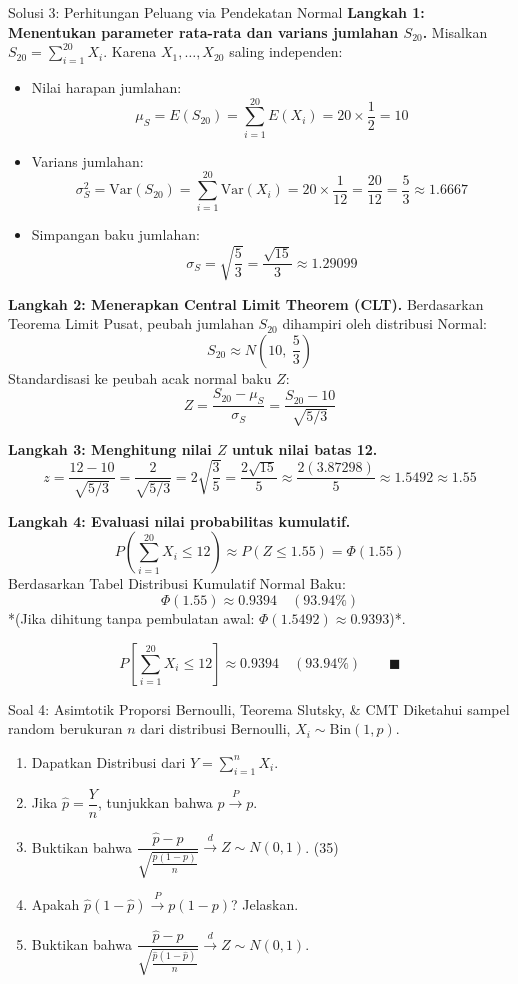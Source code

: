 \documentclass[10pt,twoside]{article}
\begin{document}
\begin{solbox}{Solusi 3: Perhitungan Peluang via Pendekatan Normal}
\textbf{Langkah 1: Menentukan parameter rata-rata dan varians jumlahan $S_{20}$.}
Misalkan $S_{20} = \sum_{i=1}^{20} X_i$. Karena $X_1, \dots, X_{20}$ saling independen:
\begin{itemize}
  \item Nilai harapan jumlahan:
  \[
  \mu_{S} = E(S_{20}) = \sum_{i=1}^{20} E(X_i) = 20 \times \frac{1}{2} = 10
  \]
  \item Varians jumlahan:
  \[
  \sigma_{S}^2 = \mathrm{Var}(S_{20}) = \sum_{i=1}^{20} \mathrm{Var}(X_i) = 20 \times \frac{1}{12} = \frac{20}{12} = \frac{5}{3} \approx 1.6667
  \]
  \item Simpangan baku jumlahan:
  \[
  \sigma_{S} = \sqrt{\frac{5}{3}} = \frac{\sqrt{15}}{3} \approx 1.29099
  \]
\end{itemize}

\textbf{Langkah 2: Menerapkan Central Limit Theorem (CLT).}
Berdasarkan Teorema Limit Pusat, peubah jumlahan $S_{20}$ dihampiri oleh distribusi Normal:
\[
S_{20} \approx N\left(10, \ \frac{5}{3}\right)
\]
Standardisasi ke peubah acak normal baku $Z$:
\[
Z = \frac{S_{20} - \mu_S}{\sigma_S} = \frac{S_{20} - 10}{\sqrt{5/3}}
\]

\textbf{Langkah 3: Menghitung nilai $Z$ untuk nilai batas 12.}
\[
z = \frac{12 - 10}{\sqrt{5/3}} = \frac{2}{\sqrt{5/3}} = 2\sqrt{\frac{3}{5}} = \frac{2\sqrt{15}}{5} \approx \frac{2(3.87298)}{5} \approx 1.5492 \approx 1.55
\]

\textbf{Langkah 4: Evaluasi nilai probabilitas kumulatif.}
\[
P\left(\sum_{i=1}^{20} X_i \le 12\right) \approx P(Z \le 1.55) = \Phi(1.55)
\]
Berdasarkan Tabel Distribusi Kumulatif Normal Baku:
\[
\Phi(1.55) \approx 0.9394 \quad (93.94\%)
\]
*(Jika dihitung tanpa pembulatan awal: $\Phi(1.5492) \approx 0.9393$)*.

\[
\boxed{P\left[\sum_{i=1}^{20} X_i \le 12\right] \approx 0.9394 \quad (93.94\%)} \qquad \blacksquare
\]
\end{solbox}

\begin{soalbox}{Soal 4: Asimtotik Proporsi Bernoulli, Teorema Slutsky, \& CMT}
Diketahui sampel random berukuran $n$ dari distribusi Bernoulli, $X_i \sim \text{Bin}(1, p)$.
\begin{enumerate}[label=(\alph*)]
  \item Dapatkan Distribusi dari $Y = \sum_{i=1}^{n} X_i$.
  \item Jika $\hat{p} = \dfrac{Y}{n}$, tunjukkan bahwa $\hat{p} \xrightarrow{P} p$.
  \item Buktikan bahwa $\dfrac{\hat{p}-p}{\sqrt{\frac{p(1-p)}{n}}} \xrightarrow{d} Z \sim N(0,1)$. (35)
  \item Apakah $\hat{p}(1-\hat{p}) \xrightarrow{P} p(1-p)$? Jelaskan.
  \item Buktikan bahwa $\dfrac{\hat{p}-p}{\sqrt{\frac{\hat{p}(1-\hat{p})}{n}}} \xrightarrow{d} Z \sim N(0,1)$.
\end{enumerate}
\end{soalbox}
\end{document}
